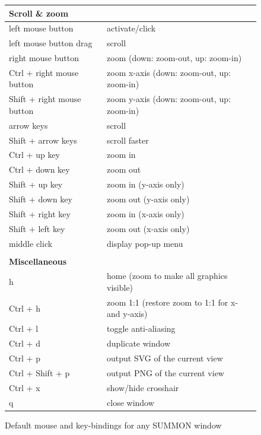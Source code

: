\documentclass[12pt]{article}
\begin{document}
\begin{figure}
\begin{center}
\footnotesize
\begin{tabular}{ll}

    {\bf Scroll \& zoom}     & \\ \hline 
    left mouse button          & activate/click \\
    left mouse button drag     & scroll \\
    right mouse button         & zoom (down: zoom-out, up: zoom-in)\\
    Ctrl + right mouse button  & zoom x-axis (down: zoom-out, up: zoom-in)\\
    Shift + right mouse button & zoom y-axis (down: zoom-out, up: zoom-in)\\
    arrow keys                 & scroll \\
    Shift + arrow keys         & scroll faster \\
    Ctrl + up key              & zoom in \\
    Ctrl + down key            & zoom out \\
    Shift + up key             & zoom in (y-axis only) \\
    Shift + down key           & zoom out (y-axis only) \\
    Shift + right key          & zoom in (x-axis only) \\
    Shift + left key           & zoom out (x-axis only) \\
    middle click               & display pop-up menu \\
    \\
    
    {\bf Miscellaneous} & \\ \hline
    h                          & home (zoom to make all graphics visible) \\
    Ctrl + h                   & zoom 1:1 (restore zoom to 1:1 for x- and y-axis) \\
    Ctrl + l                   & toggle anti-aliasing \\
    Ctrl + d                   & duplicate window \\
    Ctrl + p                   & output SVG of the current view \\
    Ctrl + Shift + p           & output PNG of the current view \\
    Ctrl + x                   & show/hide crosshair \\
    q                          & close window \\
\end{tabular}
\end{center}
\caption{Default mouse and key-bindings for any SUMMON window}
\label{fig:bindings}
\end{figure}
\end{document}
